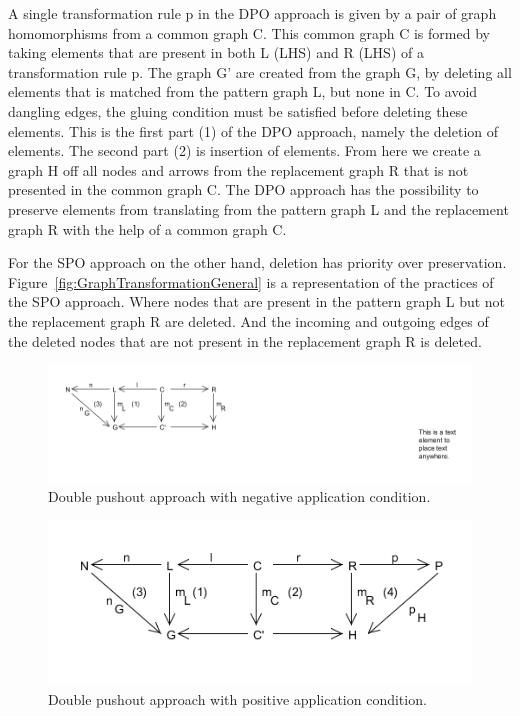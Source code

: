 A single transformation rule p in the DPO approach is given by a pair of graph
homomorphisms from a common graph C. This common graph C is formed by taking
elements that are present in both L (LHS) and R (LHS) of a transformation rule
p. The graph G' are created from the graph G, by deleting all elements that is
matched from the pattern graph L, but none in C. To avoid dangling edges,
the gluing condition must be satisfied before deleting these elements. This is
the first part (1) of the DPO approach, namely the deletion of elements. The
second part (2) is insertion of elements. From here we create a graph H off all
nodes and arrows from the replacement graph R that is not presented in the
common graph C. The DPO approach has the possibility to preserve elements from
translating from the pattern graph L and the replacement graph R with the help
of a common graph C.

For the SPO approach on the other hand, deletion has priority over preservation.
Figure~\ref{fig:GraphTransformationGeneral} is a representation of the practices
of the SPO approach. Where nodes that are present in the pattern graph L but not
the replacement graph R are deleted. And the incoming and outgoing edges of the
deleted nodes that are not present in the replacement graph R is deleted.

\begin{figure}[H]
	\centering
	\includegraphics[scale=0.7]{./Figures/Double_Pushout_NAC.png}
	\caption[The Double Pushout approach with NAC]
	{Double pushout approach with negative application condition.}
	\label{fig:DPO_NAC}
\end{figure}

\begin{figure}[H]
	\centering
	\includegraphics[scale=0.7]{./Figures/Double_Pushout_PAC.png}
	\caption[The Double Pushout approach with PAC]
	{Double pushout approach with positive application condition.}
	\label{fig:DPO_NAC}
\end{figure}






